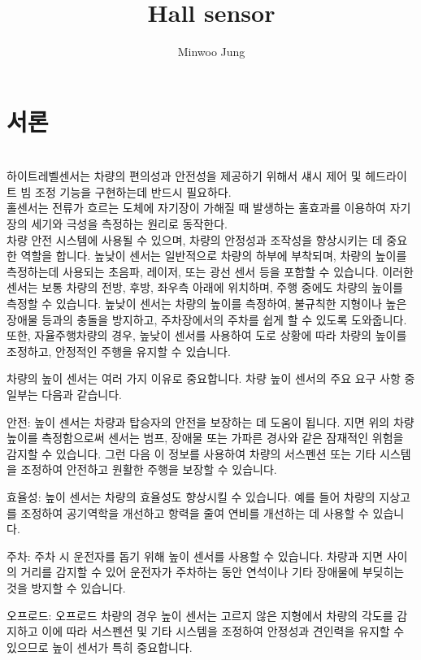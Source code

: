 \documentclass[11pt]{article}
\title{Hall sensor}
\author{Minwoo Jung}
\begin{document}
\maketitle

\section{서론}
\indent \\하이트레벨센서는 차량의 편의성과 안전성을 제공하기 위해서 섀시 제어 및 헤드라이트 빔 조정 기능을 구현하는데 반드시 필요하다.
\indent \\홀센서는 전류가 흐르는 도체에 자기장이 가해질 때 발생하는 홀효과를 이용하여 자기장의 세기와 극성을 측정하는 원리로 동작한다.
\indent \\차량 안전 시스템에 사용될 수 있으며, 차량의 안정성과 조작성을 향상시키는 데 중요한 역할을 합니다. 높낮이 센서는 일반적으로 차량의 하부에 부착되며, 차량의 높이를 측정하는데 사용되는 초음파, 레이저, 또는 광선 센서 등을 포함할 수 있습니다. 이러한 센서는 보통 차량의 전방, 후방, 좌우측 아래에 위치하며, 주행 중에도 차량의 높이를 측정할 수 있습니다. 높낮이 센서는 차량의 높이를 측정하여, 불규칙한 지형이나 높은 장애물 등과의 충돌을 방지하고, 주차장에서의 주차를 쉽게 할 수 있도록 도와줍니다. 또한, 자율주행차량의 경우, 높낮이 센서를 사용하여 도로 상황에 따라 차량의 높이를 조정하고, 안정적인 주행을 유지할 수 있습니다.

차량의 높이 센서는 여러 가지 이유로 중요합니다. 차량 높이 센서의 주요 요구 사항 중 일부는 다음과 같습니다.

안전: 높이 센서는 차량과 탑승자의 안전을 보장하는 데 도움이 됩니다. 지면 위의 차량 높이를 측정함으로써 센서는 범프, 장애물 또는 가파른 경사와 같은 잠재적인 위험을 감지할 수 있습니다. 그런 다음 이 정보를 사용하여 차량의 서스펜션 또는 기타 시스템을 조정하여 안전하고 원활한 주행을 보장할 수 있습니다.

효율성: 높이 센서는 차량의 효율성도 향상시킬 수 있습니다. 예를 들어 차량의 지상고를 조정하여 공기역학을 개선하고 항력을 줄여 연비를 개선하는 데 사용할 수 있습니다.

주차: 주차 시 운전자를 돕기 위해 높이 센서를 사용할 수 있습니다. 차량과 지면 사이의 거리를 감지할 수 있어 운전자가 주차하는 동안 연석이나 기타 장애물에 부딪히는 것을 방지할 수 있습니다.

오프로드: 오프로드 차량의 경우 높이 센서는 고르지 않은 지형에서 차량의 각도를 감지하고 이에 따라 서스펜션 및 기타 시스템을 조정하여 안정성과 견인력을 유지할 수 있으므로 높이 센서가 특히 중요합니다.
\end{document}
